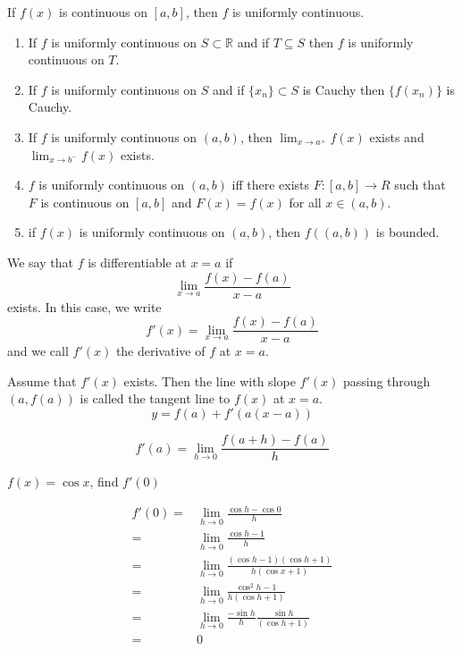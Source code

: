 
\begin{thm}
If $f(x)$ is continuous on $[a,b]$, then $f$ is uniformly continuous.
\end{thm}

\begin{enumerate}
    \item If $f$ is uniformly continuous on $S\subset \mathbb{R}$ and if $T\subseteq S$ then $f$ is uniformly continuous on $T$.
    \item If $f$ is uniformly continuous on $S$ and if $\{x_n\}\subset S$ is Cauchy then $\{f(x_n)\}$ is Cauchy.
    \item If $f$ is uniformly continuous on $(a,b)$, then $\lim_{x\to a^+} f(x)$ exists and $\lim_{x\to b^-}f(x)$ exists.
    \item $f$ is uniformly continuous on $(a,b)$ iff there exists $F\colon [a,b] \to R$ such that $F$ is continuous on $[a,b]$ and $F(x) = f(x)$ for all $x\in (a,b)$.
    \item if $f(x)$ is uniformly continuous on $(a,b)$, then $f((a,b))$ is bounded.
\end{enumerate}


\begin{defn}[Differentiable]
We say that $f$ is differentiable at $x=a$ if \[\lim_{x\to a } \frac{f(x)-f(a)}{x-a}\] exists. In this case, we write \[f' (x) = \lim_{x\to a} \frac{f(x) - f(a)}{x-a}\] and we call $f' (x)$ the derivative of $f$ at $x=a$.
\end{defn}

\begin{defn}
Assume that $f' (x)$ exists. Then the line with slope $f' (x)$ passing through $(a,f(a))$ is called the tangent line to $f(x)$ at $x=a$. \[y =f(a)+ f' (a (x-a))\]
\end{defn}

\begin{defn}
\[f'(a) = \lim_{h\to 0} \frac{f(a+h) - f(a)}{h}\]
\end{defn}

\begin{exmp}
$f(x) = \cos x$, find $f'(0)$
\end{exmp}
\begin{solution}
\begin{align*}
    f'(0) = & \lim_{h\to 0} \frac{\cos h - \cos 0}{ h} \\
    = & \lim_{h\to 0} \frac{\cos h - 1}{h}\\
    = & \lim_{h\to 0} \frac{(\cos h - 1)(\cos h + 1)}{h(\cos x + 1)} \\
    = & \lim_{h\to 0} \frac{\cos ^2 h - 1}{h(\cos h + 1)} \\
    = & \lim_{h\to 0} \frac{-\sin h}{h} \frac{\sin h}{(\cos h + 1)} \\
    = & 0
\end{align*}
\end{solution}

